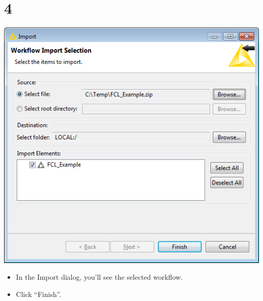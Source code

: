 \documentclass[10pt]{beamer}
\begin{document}
\section{4}
\begin{frame}
	\begin{center}
  		\includegraphics[height=0.6\textheight]{4.png}
	\end{center}
	\begin{itemize}
		\item In the Import dialog, you'll see the selected workflow.
		\item Click ``Finish''.
	\end{itemize}
\end{frame}
\end{document}
